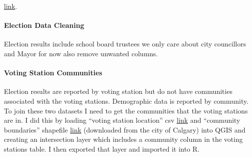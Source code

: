 \documentclass[
]{article}
\newenvironment{Shaded}{\begin{snugshade}}{\end{snugshade}}
\newcommand{\KeywordTok}[1]{\textcolor[rgb]{0.13,0.29,0.53}{\textbf{#1}}}
\newcommand{\NormalTok}[1]{#1}
\newcommand{\OperatorTok}[1]{\textcolor[rgb]{0.81,0.36,0.00}{\textbf{#1}}}
\newcommand{\StringTok}[1]{\textcolor[rgb]{0.31,0.60,0.02}{#1}}
\let\oldparagraph\paragraph
\renewcommand{\paragraph}[1]{\oldparagraph{#1}\mbox{}}
\begin{document}
\href{https://data.calgary.ca/Government/2017-Official-Election-Results-by-Voting-Station/atsy-3a4w}{link}.

\hypertarget{election-data-cleaning}{%
\paragraph{Election Data Cleaning}\label{election-data-cleaning}}

Election results include school board trustees we only care about city
councillors and Mayor for now also remove unwanted columns.

\begin{Shaded}
\end{Shaded}

\hypertarget{voting-station-communities}{%
\paragraph{Voting Station
Communities}\label{voting-station-communities}}

Election results are reported by voting station but do not have
communities associated with the voting stations. Demographic data is
reported by community. To join these two datasets I need to get the
communities that the voting stations are in. I did this by loading
``voting station location'' csv
\href{https://data.calgary.ca/Government/Voting-Stations-Effective-October-16-2017-/ps5q-maip}{link}
and ``community boundaries'' shapefile
\href{https://data.calgary.ca/Base-Maps/Community-Boundaries/surr-xmvs}{link}
(downloaded from the city of Calgary) into QGIS and creating an
intersection layer which includes a community column in the voting
stations table. I then exported that layer and imported it into R.
\end{document}
